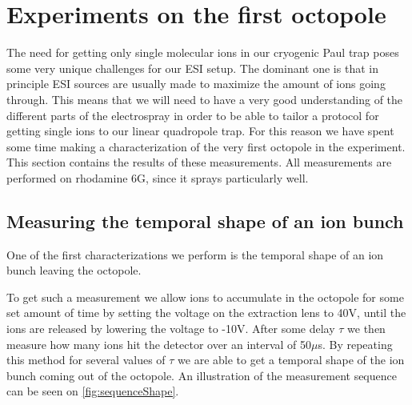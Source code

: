 \section{Experiments on the first octopole}
\label{sec:octopoleExperiments}
The need for getting only single molecular ions in our cryogenic Paul trap poses some very unique challenges for our ESI setup. The dominant one is that in principle ESI sources are usually made to maximize the amount of ions going through. This means that we will need to have a very good understanding of the different parts of the electrospray in order to be able to tailor a protocol for getting single ions to our linear quadropole trap.
For this reason we have spent some time making a characterization of the very first octopole in the experiment. 
This section contains the results of these measurements. All measurements are performed on rhodamine 6G, since it sprays particularly well.

\subsection{Measuring the temporal shape of an ion bunch}
One of the first characterizations we perform is the temporal shape of an ion bunch leaving the octopole.

To get such a measurement we allow ions to accumulate in the octopole for some set amount of time by setting the voltage on the extraction lens to 40V, until the ions are released by lowering the voltage to -10V. After some delay $\tau$ we then measure how many ions hit the detector over an interval of 50$\mu$s. By repeating this method for several values of $\tau$ we are able to get a temporal shape of the ion bunch coming out of the octopole.
An illustration of the measurement sequence can be seen on \cref{fig:sequenceShape}. 

